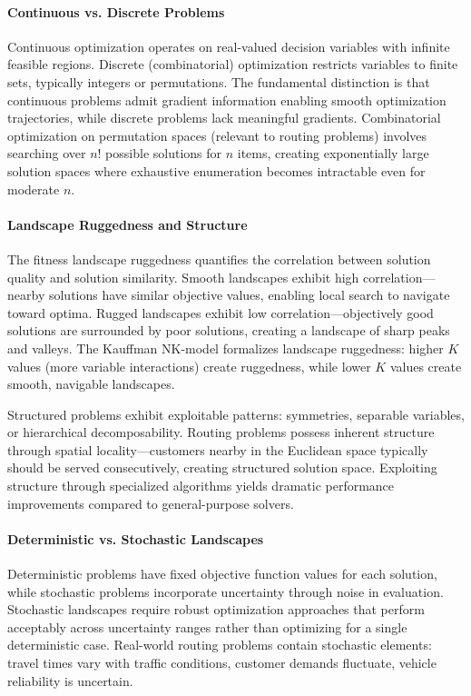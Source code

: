 \paragraph{Continuous vs. Discrete Problems}

Continuous optimization operates on real-valued decision variables with infinite feasible regions. Discrete (combinatorial) optimization restricts variables to finite sets, typically integers or permutations. The fundamental distinction is that continuous problems admit gradient information enabling smooth optimization trajectories, while discrete problems lack meaningful gradients. Combinatorial optimization on permutation spaces (relevant to routing problems) involves searching over $n!$ possible solutions for $n$ items, creating exponentially large solution spaces where exhaustive enumeration becomes intractable even for moderate $n$.

\paragraph{Landscape Ruggedness and Structure}

The fitness landscape ruggedness quantifies the correlation between solution quality and solution similarity. Smooth landscapes exhibit high correlation—nearby solutions have similar objective values, enabling local search to navigate toward optima. Rugged landscapes exhibit low correlation—objectively good solutions are surrounded by poor solutions, creating a landscape of sharp peaks and valleys. The Kauffman NK-model formalizes landscape ruggedness: higher $K$ values (more variable interactions) create ruggedness, while lower $K$ values create smooth, navigable landscapes.

Structured problems exhibit exploitable patterns: symmetries, separable variables, or hierarchical decomposability. Routing problems possess inherent structure through spatial locality—customers nearby in the Euclidean space typically should be served consecutively, creating structured solution space. Exploiting structure through specialized algorithms yields dramatic performance improvements compared to general-purpose solvers.

\paragraph{Deterministic vs. Stochastic Landscapes}

Deterministic problems have fixed objective function values for each solution, while stochastic problems incorporate uncertainty through noise in evaluation. Stochastic landscapes require robust optimization approaches that perform acceptably across uncertainty ranges rather than optimizing for a single deterministic case. Real-world routing problems contain stochastic elements: travel times vary with traffic conditions, customer demands fluctuate, vehicle reliability is uncertain.

